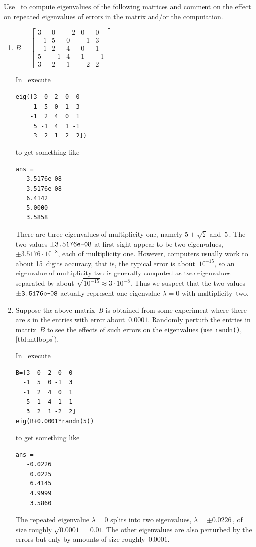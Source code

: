 \begin{example} 
Use \script\ to compute eigenvalues of the following matrices and comment on the effect on repeated eigenvalues of errors in the matrix and/or the computation.
\begin{enumerate}

\item \(B=\begin{bmatrix} 3&0&-2&0&0
\\-1&5&0&-1&3
\\-1&2&4&0&1
\\5&-1&4&1&-1
\\3&2&1&-2&2\end{bmatrix}\)
\begin{solution} 
In \script\ execute
\begin{verbatim}
eig([3  0 -2  0  0
    -1  5  0 -1  3
    -1  2  4  0  1
     5 -1  4  1 -1
     3  2  1 -2  2])
\end{verbatim}
\setbox\ajrqrbox\hbox{}%
\marginajrbox%
to get something like
\begin{verbatim}
ans =
  -3.5176e-08
   3.5176e-08
   6.4142
   5.0000
   3.5858
\end{verbatim}
There are three eigenvalues of multiplicity one, namely \(5\pm\sqrt2\) and~\(5\)\,.  
The two values \(\pm\verb|3.5176e-08|\) at first sight appear to be two eigenvalues, \(\pm3.5176\cdot10^{-8}\), each of multiplicity one.  
However, computers usually work to about 15~digits accuracy, that is, the typical error is about~\(10^{-15}\), so an eigenvalue of multiplicity two is generally computed as two eigenvalues separated by about \(\sqrt{10^{-15}}\approx3\cdot10^{-8}\).
Thus we suspect that the two values~\(\pm\verb|3.5176e-08|\) actually represent one eigenvalue \(\lambda=0\) with multiplicity~two.
\end{solution}


\item Suppose the above matrix~\(B\) is obtained from some experiment where there are s in the entries with error about~\(0.0001\).
Randomly perturb the entries in matrix~\(B\) to see the effects of such errors on the eigenvalues (use \verb|randn()|, \autoref{tbl:mtlbops}).
\begin{solution} 
In \script\ execute
\begin{verbatim}
B=[3  0 -2  0  0
  -1  5  0 -1  3
  -1  2  4  0  1
   5 -1  4  1 -1
   3  2  1 -2  2]
eig(B+0.0001*randn(5))
\end{verbatim}
\setbox\ajrqrbox\hbox{}%
\marginajrbox%
to get something like
\begin{verbatim}
ans =
   -0.0226
    0.0225
    6.4145
    4.9999
    3.5860
\end{verbatim}
The repeated eigenvalue \(\lambda=0\) splits into two eigenvalues, \(\lambda=\pm0.0226\)\,, of size roughly \(\sqrt{0.0001}=0.01\).
The other eigenvalues are also perturbed by the errors but only by amounts of size roughly~\(0.0001\).


\end{solution}
\end{enumerate}
\end{example}

